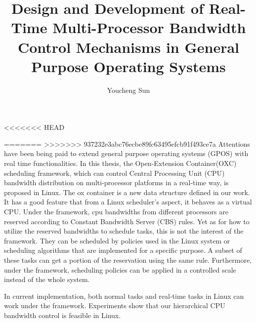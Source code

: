\documentclass[a4paper, 12pt, openright, oneside, final]{book}%
\title{Design and Development of Real-Time Multi-Processor Bandwidth
  Control Mechanisms in General Purpose Operating Systems}
\author{Youcheng Sun}
\newcommand{\fncyblank}{\fancyhf{}}
\newenvironment{abstract}%
{\cleardoublepage\fncyblank\null\vfill\begin{center}%
\bfseries\abstractname\end{center}}%
{\vfill\null}
\begin{document}
\frontmatter


%

\begin{abstract}
<<<<<<< HEAD


=======
>>>>>>> 937232e3abc76ecbe89fc63495efcb91f493ce7a
  Attentions have been being paid to extend general purpose operating
  systems (GPOS) with real time functionalities. In this thesis, the
  Open-Extension Container(OXC) scheduling framework, which can control 
  Central Processing Unit (CPU) bandwidth distribution on multi-processor 
  platforms in a real-time way, is proposed in Linux. The ox container 
  is a new data structure defined in our work. It has a good feature 
  that from a Linux scheduler's aspect, it behaves as a virtual CPU.  
  Under the framework, cpu bandwidths from different processors are 
  reserved according to Constant Bandwidth Server (CBS) rules.  Yet 
  as for how to utilize the reserved bandwidths to schedule tasks, 
  this is not the interest of the framework. They can be scheduled by 
  policies used in the Linux system or scheduling algorithms that are 
  implemented for a specific purpose. A subset of these tasks can get 
  a portion of the reservation using the same rule.  Furthermore, under 
  the framework, scheduling policies can be applied in a controlled scale 
  instead of the whole system.

  In current implementation, both normal tasks and real-time tasks in
  Linux can work under the framework. Experiments show that our 
  hierarchical CPU bandwidth control is feasible in Linux.
\end{abstract}

\tableofcontents
\listoffigures

\mainmatter







\end{document}
